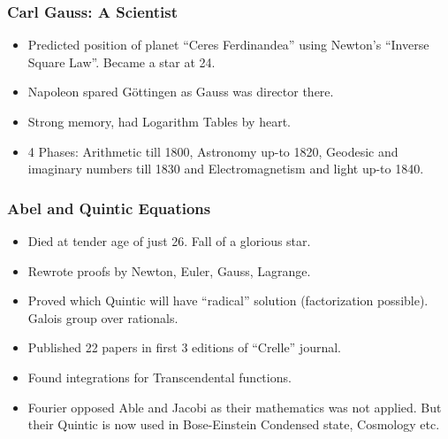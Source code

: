 \begin{frame}[fragile]
\frametitle{Carl Gauss: A Scientist}
\begin{itemize}
\item Predicted position of planet ``Ceres Ferdinandea'' using Newton's ``Inverse Square Law''.  Became a star at 24.
\item Napoleon spared G\"ottingen as Gauss was director there.
\item Strong memory, had Logarithm Tables by heart.
\item 4 Phases: Arithmetic till 1800, Astronomy up-to 1820, Geodesic and imaginary numbers till 1830 and Electromagnetism and light up-to 1840.
\end{itemize}
\end{frame}

\begin{frame}[fragile]
\frametitle{Abel and Quintic Equations}
\begin{itemize}
\item Died at tender age of just 26. Fall of a glorious star.
\item Rewrote proofs by Newton, Euler, Gauss, Lagrange.
\item Proved which Quintic will have ``radical'' solution (factorization possible). Galois group over rationals.
\item Published 22 papers in first 3 editions of ``Crelle'' journal.
\item Found integrations for Transcendental functions.
\item Fourier opposed Able and Jacobi as their mathematics was not applied. But their Quintic is now used in Bose-Einstein Condensed state, Cosmology etc.
\end{itemize}
\end{frame}

